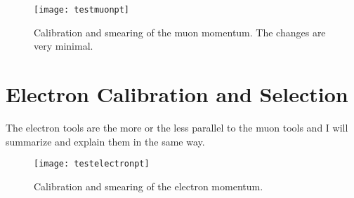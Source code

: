 \begin{figure}[h]
\centering
\texttt{[image: testmuonpt]}
\caption{Calibration and smearing of the muon momentum. The changes are very minimal.}
\label{fig:testmuonpt}
\end{figure}

\section{Electron Calibration and Selection}

The electron tools are the more or the less parallel to the muon tools and I will summarize and explain them in the same way.

\begin{figure}
\centering
\texttt{[image: testelectronpt]}
\caption{Calibration and smearing of the electron momentum.}
\label{fig:testelectronpt}
\end{figure}